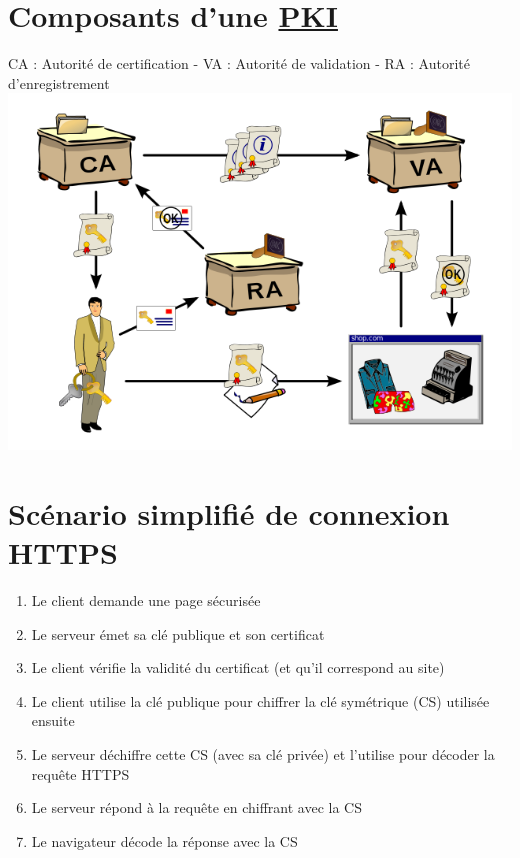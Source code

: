 \hypertarget{composants-dune-pki1}{%
\section{\texorpdfstring{Composants d'une
\href{https://en.wikipedia.org/wiki/Public_key_infrastructure}{PKI}}{Composants d'une PKI}}\label{composants-dune-pki1}}

CA : Autorité de certification - VA : Autorité de validation - RA :
Autorité d'enregistrement
\includegraphics{src/img/Public-Key-Infrastructure.png}

\hypertarget{scuxe9nario-simplifiuxe9-de-connexion-https}{%
\section{Scénario simplifié de connexion
HTTPS}\label{scuxe9nario-simplifiuxe9-de-connexion-https}}

\begin{enumerate}
\def\labelenumi{\arabic{enumi}.}
\tightlist
\item
  Le client demande une page sécurisée
\item
  Le serveur émet sa clé publique et son certificat
\item
  Le client vérifie la validité du certificat (et qu'il correspond au
  site)
\item
  Le client utilise la clé publique pour chiffrer la clé symétrique (CS)
  utilisée ensuite
\item
  Le serveur déchiffre cette CS (avec sa clé privée) et l'utilise pour
  décoder la requête HTTPS
\item
  Le serveur répond à la requête en chiffrant avec la CS
\item
  Le navigateur décode la réponse avec la CS
\end{enumerate}

